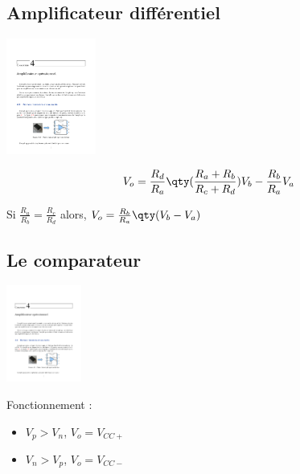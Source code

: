 \subsection{Amplificateur différentiel}
\begin{multicols*}{2}
\centering
\includegraphics[trim={2.5in 7.625in 2.5in 1.125in}, clip=true,page=7,height=1.5in]{fig/fig.pdf}

\begin{equation*}
    V_o = \frac{R_d}{R_a}\qty(\frac{R_a + R_b}{R_c + R_d})V_b-\frac{R_b}{R_a}V_a
\end{equation*}
\end{multicols*}
\raggedleft
\vspace{-2\baselineskip}
Si \( \frac{R_a}{R_b} = \frac{R_c}{R_d}\) alors, \(V_o = \frac{R_b}{R_a}\qty(V_b-V_a)\)


\subsection{Le comparateur}
\begin{multicols*}{2}
\centering
\includegraphics[trim={2.5in 8in 2.5in 1in}, clip=true,page=10,height=1.25in]{fig/fig.pdf}

Fonctionnement :
\begin{itemize}[nosep]
    \item \(V_p > V_n\), \(V_o = V_{CC+}\)
    \item \(V_n > V_p\), \(V_o = V_{CC-}\)
\end{itemize}
\end{multicols*}